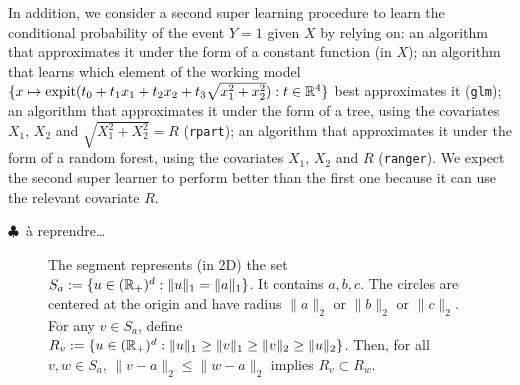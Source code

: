 In  addition, we  consider  a second  super learning  procedure  to learn  the
conditional  probability of  the  event  $Y=1$ given  $X$  by  relying on:  an
algorithm that approximates it under the form of a constant function (in $X$);
an   algorithm   that   learns   which    element   of   the   working   model
$\{x \mapsto \operatorname{expit}(t_{0} + t_{1} x_{1}  + t_{2} x_{2} + t_{3} \sqrt{x_{1}^{2}
  + x_{2}^{2}})  : t \in  \mathbb{R}^{4}\}$ best approximates it  (\texttt{glm}); an
algorithm that approximates it under the  form of a tree, using the covariates
$X_{1}$, $X_{2}$ and  $\sqrt{X_{1}^{2} + X_{2}^{2}} =  R$ (\texttt{rpart}); an
algorithm that  approximates it under the  form of a random  forest, using the
covariates $X_{1}$,  $X_{2}$ and $R$  (\texttt{ranger}). We expect  the second
super learner  to perform  better than the  first one because  it can  use the
relevant covariate $R$.

$\clubsuit$~à reprendre\ldots

\begin{figure}
  \centering
  \label{fig:explain}
  \caption{The      segment      represents      (in     2D)      the      set
    $S_{a}:=\{u \in  (\mathbb{R}_{+})^{d} :  \|u\|_{1} = \|a\|_{1}\}$.   It contains
    $a,b,c$.   The  circles  are  centered  at  the  origin  and  have  radius
    $\|a\|_{2}$ or $\|b\|_{2}$ or $\|c\|_{2}$.   For any $v \in S_{a}$, define
    $R_{v}:= \{u \in (\mathbb{R}_{+})^{d} :  \|u\|_{1} \geq \|v\|_{1} \geq \|v\|_{2}
    \geq     \|u\|_{2}\}$.      Then,      for     all     $v,w\in     S_{a}$,
    $\|v-a\|_{2} \leq \|w-a\|_{2}$ implies $R_{v} \subset R_{w}$.}
\end{figure}

